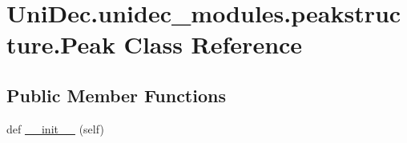 \hypertarget{class_uni_dec_1_1unidec__modules_1_1peakstructure_1_1_peak}{}\section{Uni\+Dec.\+unidec\+\_\+modules.\+peakstructure.\+Peak Class Reference}
\label{class_uni_dec_1_1unidec__modules_1_1peakstructure_1_1_peak}
\subsection*{Public Member Functions}
\begin{DoxyCompactItemize}
\item 
def \hyperlink{class_uni_dec_1_1unidec__modules_1_1peakstructure_1_1_peak_afe277eae2bb89f885913e329fb566983}{\+\_\+\+\_\+init\+\_\+\+\_\+} (self)
\end{DoxyCompactItemize}
